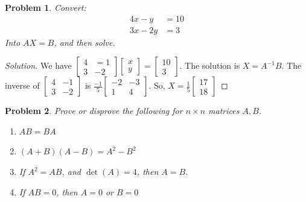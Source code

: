 \documentclass[oneside]{book}
\theoremstyle{mystyle}
\newtheorem{problem}{Problem}[section]
\begin{document}
\begin{problem}
Convert:
\begin{align*}
    4x - y &= 10\\
    3x - 2y &= 3
\end{align*}
Into $AX = B$, and then solve.
\end{problem}
\begin{proof}[Solution]
We have $\begin{bmatrix} 4 & =1 \\ 3 & -2 \end{bmatrix} \begin{bmatrix} x \\ y \end{bmatrix} = \begin{bmatrix} 10 \\ 3 \end{bmatrix}$. The solution is $X = A^{-1}B$. The inverse of $\begin{bmatrix} 4 & -1 \\ 3 & -2 \end{bmatrix}$ is $\frac{-1}{5}\begin{bmatrix} -2 & -3 \\ 1 & 4\end{bmatrix}$. So, $X = \frac{1}{5} \begin{bmatrix} 17 \\ 18 \end{bmatrix}$
\end{proof}
\begin{problem}
Prove or disprove the following for $n\times n$ matrices $A, B$.
\begin{enumerate}
    \item $AB = BA$
    \item $(A+B)(A-B) = A^2 - B^2$
    \item If $A^2 = AB$, and $\det(A) = 4$, then $A=B$.
    \item If $AB = 0$, then $A=0$ or $B=0$
\end{enumerate}
\end{problem}
\end{document}
